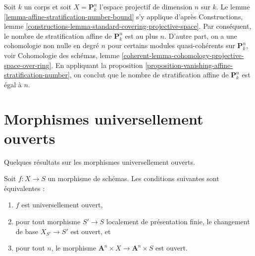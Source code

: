 \begin{example}
\label{example-affine-stratification-number}
Soit $k$ un corps et soit $X = \mathbf{P}^n_k$ l'espace projectif de dimension $n$
sur $k$. Le lemme \ref{lemma-affine-stratification-number-bound}
s'y applique d'après Constructions, lemme
\ref{constructions-lemma-standard-covering-projective-space}.
Par conséquent, le nombre de stratification affine de $\mathbf{P}^n_k$ est
au plus $n$. D'autre part, on a une cohomologie non nulle
en degré $n$ pour certains modules quasi-cohérents sur
$\mathbf{P}^n_k$, voir
Cohomologie des schémas, lemme
\ref{coherent-lemma-cohomology-projective-space-over-ring}.
En appliquant la proposition \ref{proposition-vanishing-affine-stratification-number},
on conclut que le nombre de stratification affine de
$\mathbf{P}^n_k$ est égal à $n$.
\end{example}








\section{Morphismes universellement ouverts}
\label{section-universally-open}

\noindent
Quelques résultats sur les morphismes universellement ouverts.

\begin{lemma}
\label{lemma-test-universally-open}
Soit $f : X \to S$ un morphisme de schémas.
Les conditions suivantes sont équivalentes :
\begin{enumerate}
\item $f$ est universellement ouvert,
\item pour tout morphisme $S' \to S$ localement de présentation finie,
le changement de base $X_{S'} \to S'$ est ouvert, et
\item pour tout $n$, le morphisme
$\mathbf{A}^n \times X \to \mathbf{A}^n \times S$
est ouvert.
\end{enumerate}
\end{lemma}

